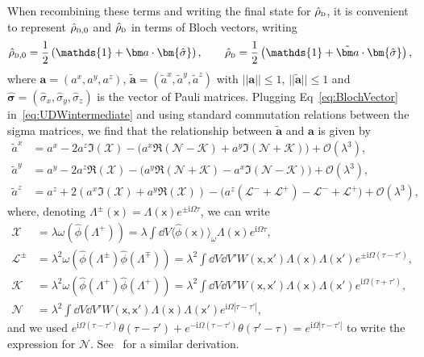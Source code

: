 \documentclass[letterpaper,12pt,titlepage,oneside,final]{book}
\newcommand{\openone}{\mathds{1}}
\newcommand{\mf}{\mathsf}%
\newcommand{\ii}{\mathrm{i}}
\renewcommand{\r}{\hat{\rho}}
\newcommand{\s}{\hat{\sigma}}
\newcommand{\tc}[1]{\textsc{#1}}
\begin{document}
When recombining these terms and writing the final state for $\r_\tc{d}$, it is convenient to represent $\r_{\tc{d},0}$ and $\r_\tc{d}$ in terms of Bloch vectors, writing
\begin{align}\label{eq:BlochVector}
    \r_{\tc{d},0} = \frac{1}{2}\left(\openone + \bm a \cdot \bm{\s}\right), \quad\quad \r_{\tc{d}} = \frac{1}{2}\left(\openone + \tilde{\bm a}\cdot \bm{\s}\right), 
\end{align}
where $\bm a = (a^x,a^y,a^z)$, $\tilde{\bm a} = (\tilde{a}^x,\tilde{a}^y,\tilde{a}^z)$ with $||\bm a|| \leq 1$, $|| \tilde{\bm a}|| \leq 1$ and $\bm \s = (\s_x,\s_y,\s_z)$ is the vector of Pauli matrices. Plugging Eq~\eqref{eq:BlochVector} in~\eqref{eq:UDWintermediate} and using standard commutation relations between the sigma matrices, we find that the relationship between $\tilde{\bm a}$ and $\bm a$ is given by
\begin{align}
    \tilde{a}^x &= a^x - 2 a^z \Im(\mathcal{X}) - \big(a^x \Re(\mathcal{N} - \mathcal{K}) + a^y \Im(\mathcal{N}+\mathcal{K})\big) + \mathcal{O}(\lambda^3),\label{eq:ax}\\
    \tilde{a}^y &= a^y - 2  a^z \Re(\mathcal{X}) - \big(a^y \Re(\mathcal{N}+\mathcal{K}) - a^x \Im(\mathcal{N}-\mathcal{K})\big) + \mathcal{O}(\lambda^3),\label{eq:ay}\\
    \tilde{a}^z &= a^z + 2 (a^x\Im(\mathcal{X}) + a^y \Re(\mathcal{X})) - \big(a^z (\mathcal{L}^- + \mathcal{L}^+) - \mathcal{L}^- + \mathcal{L}^+\big) + \mathcal{O}(\lambda^3),\label{eq:az}
\end{align}
where, denoting $\Lambda^\pm(\mf x) = \Lambda(\mf x) e^{\pm \ii \Omega\tau}$, we can write
\begin{align}
    \mathcal{X} &= \lambda \omega(\hat{\phi}(\Lambda^+)) = \lambda\int \dd V \langle\hat{\phi}(\mf x)\rangle_\omega \Lambda(\mf x) e^{\ii \Omega \tau},\\
    \mathcal{L}^\pm &= \lambda^2\omega(\hat{\phi}(\Lambda^\pm)\hat{\phi}(\Lambda^\mp)) = \lambda^2\int \dd V \dd V' W(\mf x,\mf x') \Lambda(\mf x)\Lambda(\mf x')e^{\pm \ii \Omega(\tau - \tau')},\\
    \mathcal{K} &= \lambda^2\omega(\hat{\phi}(\Lambda^+)\hat{\phi}(\Lambda^+)) = \lambda^2\int \dd V \dd V' W(\mf x,\mf x') \Lambda(\mf x)\Lambda(\mf x')e^{\ii \Omega(\tau + \tau')},\\
    \mathcal{N} &= \lambda^2\int \dd V \dd V' W(\mf x,\mf x') \Lambda(\mf x)\Lambda(\mf x')e^{\ii \Omega|\tau - \tau'|},
\end{align}
and we used $e^{\ii \Omega(\tau - \tau')}\theta(\tau - \tau') +
e^{-\ii \Omega(\tau - \tau')}\theta(\tau' - \tau) = e^{\ii \Omega|\tau-\tau'|}$ to write the expression for $\mathcal{N}$. See~\cite{ruhi} for a similar derivation.
\end{document}
